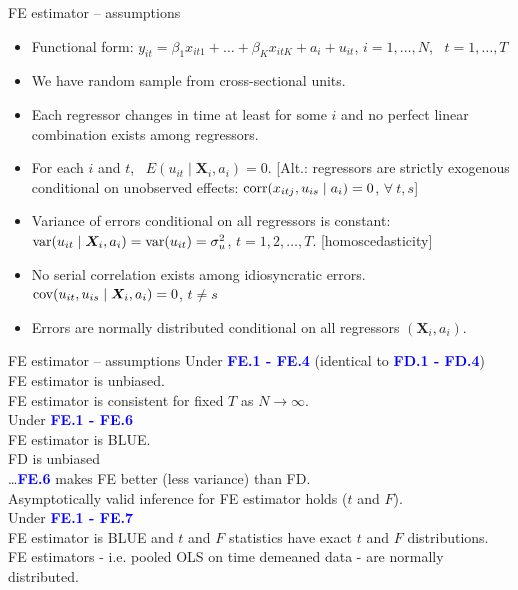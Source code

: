 \documentclass[usenames,dvipsnames]{beamer}
\begin{document}
\begin{frame}{FE estimator – assumptions}
\begin{itemize}
\item[\textbf{FE.1}] Functional form: $y_{it} = \beta_1 x_{it1} + \dots + \beta_K x_{itK} + a_i + u_{it}$, $i = 1, \dots, N$, \ $t = 1, \dots, T$
\item[\textbf{FE.2}] We have random sample from cross-sectional units.
\item[\textbf{FE.3}] Each regressor changes in time at least for some $i$ and no perfect linear combination exists among regressors.
\item[\textbf{FE.4}] For each $i$ and $t$, \ $E (u_{it} \mid \bm{X}_i, a_i) = 0$. [Alt.: regressors are strictly exogenous conditional on unobserved effects: $\textnormal{corr}(x_{itj}, u_{is} \mid a_i)=0$, \quad $\forall \ t, s$]
\item[\textbf{FE.5}] Variance of errors conditional on all regressors is constant: $\textnormal{var}(u_{it} \mid \bm{X}_i, a_i) = \textnormal{var}(u_{it}) = \sigma^2_u$, \quad $t= 1,2, \dots, T$. [homoscedasticity]
\item[\textbf{FE.6}] No serial correlation exists among idiosyncratic errors. $\textnormal{cov}(u_{it}, u_{is} \mid \bm{X}_i, a_i) = 0$, \quad $t \neq s$
\item[\textbf{FE.7}] Errors are normally distributed conditional on all regressors $(\bm{X}_i, a_i)$.
\end{itemize}
\end{frame}
\begin{frame}{FE estimator – assumptions}
Under \textcolor{blue}{\textbf{FE.1 - FE.4}} (identical to  \textcolor{blue}{\textbf{FD.1 - FD.4}})\\
FE estimator is unbiased. \\
FE estimator is consistent for fixed $T$ as $N \rightarrow \infty$.\\
\vspace{0.5cm}
Under \textcolor{blue}{\textbf{FE.1 - FE.6}}\\
FE estimator is BLUE.\\
FD is unbiased\\ \dots  \textcolor{blue}{\textbf{FE.6}} makes FE better (less variance) than FD.\\
Asymptotically valid inference for FE estimator holds ($t$ and $F$).\\
\vspace{0.5cm}
Under  \textcolor{blue}{\textbf{FE.1 - FE.7}}\\
FE estimator is BLUE and $t$ and $F$ statistics have exact $t$ and $F$ distributions.\\
FE estimators - i.e. pooled OLS on time demeaned data - are normally distributed.
\end{frame}
\end{document}
